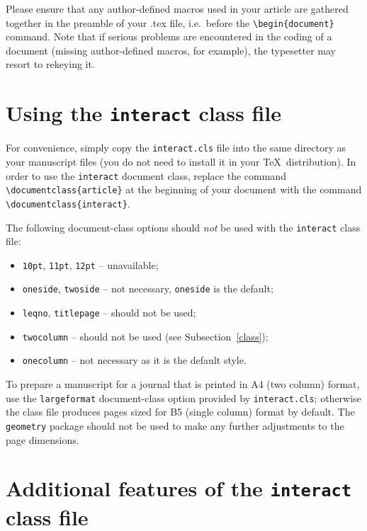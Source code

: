 \documentclass[]{interact}
\theoremstyle{plain}%
\theoremstyle{definition}
\theoremstyle{remark}
\begin{document}
Please ensure that any author-defined macros used in your article are gathered together in the preamble of your .tex file, i.e.\ before the \verb"\begin{document}" command. Note that if serious problems are encountered in the coding of a document (missing author-defined macros, for example), the typesetter may resort to rekeying it.


\section{Using the \texttt{interact} class file}

For convenience, simply copy the \texttt{interact.cls} file into the same directory as your manuscript files (you do not need to install it in your \TeX\ distribution). In order to use the \texttt{interact} document class, replace the command \verb"\documentclass{article}" at the beginning of your document with the command \verb"\documentclass{interact}".

The following document-class options should \emph{not} be used with the \texttt{interact} class file:
\begin{itemize}
  \item \texttt{10pt}, \texttt{11pt}, \texttt{12pt} -- unavailable;
  \item \texttt{oneside}, \texttt{twoside} -- not necessary, \texttt{oneside} is the default;
  \item \texttt{leqno}, \texttt{titlepage} -- should not be used;
  \item \texttt{twocolumn} -- should not be used (see Subsection~\ref{class});
  \item \texttt{onecolumn} -- not necessary as it is the default style.
\end{itemize}
To prepare a manuscript for a journal that is printed in A4 (two column) format, use the \verb"largeformat" document-class option provided by \texttt{interact.cls}; otherwise the class file produces pages sized for B5 (single column) format by default. The \texttt{geometry} package should not be used to make any further adjustments to the page dimensions.



\section{Additional features of the \texttt{interact} class file}
\end{document}
